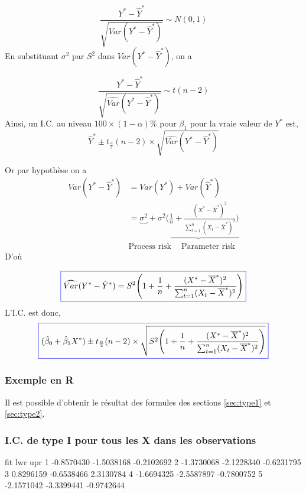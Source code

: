 \documentclass[11pt,french]{report}
\begin{document}
$$
\frac{Y^* - \hat{Y}^*}{\sqrt{Var(Y^* - \hat{Y}^*)}} \sim N(0,1)
$$
En substituant $\sigma^2$ par $S^2$ dans $Var(Y^* - \hat{Y}^*)$, on a

$$
\frac{Y^* - \hat{Y}^*}{\sqrt{\widehat{Var}(Y^* - \hat{Y}^*)}} \sim t(n-2)
$$
Ainsi, un I.C. au niveau $100 \times (1 - \alpha)\%$ pour $\beta_1$  pour la vraie valeur de $Y^*$ est,
$$
\hat{Y}^* \pm t_{\frac{\alpha}{2}}(n-2)\times \sqrt{\widehat{Var}(Y^* - \hat{Y}^*)}
$$

Or par hypothèse on a
\begin{align*}
Var(Y^* - \hat{Y}^*) &= Var(Y^*) + Var(\hat{Y}^*) \\
&= \underbrace{\sigma^2} +\underbrace{\sigma^2\big( \frac{1}{n} + \frac{(X^* - \overline{X}^*)^2}{\sum_{t=1}^n (X_t - \overline{X}^*)^2}\big)}  \\
&   \text{Process risk }\ \ \ \  \text{Parameter risk}
\end{align*}
D'où 

\begin{equation}
\label{eq:var2*}
\color{blue}
\boxed{\color{black}
\widehat{Var}(Y^* - \hat{Y}^*) = S^2 \Bigg(1 + \frac{1}{n} + \frac{(X^* - \overline{X}^*)^2}{\sum_{t=1}^n (X_t - \overline{X}^*)^2}\Bigg)  
}
\end{equation}
L'I.C. est donc,
\begin{equation}
\label{eq:IC3}
\color{blue}
\boxed{\color{black}
(\hat{\beta}_0 + \hat{\beta}_1X^*) \pm t_{\frac{\alpha}{2}}(n-2)\times \sqrt{S^2 \Bigg(1 + \frac{1}{n} + \frac{(X^* - \overline{X}^*)^2}{\sum_{t=1}^n (X_t - \overline{X}^*)^2}\Bigg)}  
}
\end{equation}

\subsubsection*{Exemple en R}
Il est possible d'obtenir le résultat des formules des sections \ref{sec:type1} et \ref{sec:type2}.

\subsubsection*{I.C. de type I pour tous les X dans les observations}
\begin{Schunk}
\begin{Soutput}
         fit        lwr        upr
1 -0.8570430 -1.5038168 -0.2102692
2 -1.3730068 -2.1228340 -0.6231795
3  0.8296159 -0.6538466  2.3130784
4 -1.6694325 -2.5587897 -0.7800752
5 -2.1571042 -3.3399441 -0.9742644
\end{Soutput}
\end{Schunk}
\end{document}
